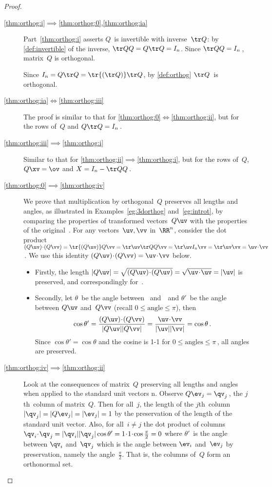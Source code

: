 \begin{proof}
\begin{description}
\item[\ref{thm:orthog:i}$\implies$\ref{thm:orthog:0},\ref{thm:orthog:ia}]
Part~\ref{thm:orthog:i} asserts \(Q\)~is invertible with inverse~\(\tr Q\): by \autoref{def:invertible} of the inverse, \(\tr QQ=Q\tr Q=I_n\).  
Since \(\tr QQ=I_n\)\,, matrix~\(Q\) is orthogonal.
 
Since \(I_n=Q\tr Q=\tr{(\tr Q)}\tr Q\), by \autoref{def:orthog} \(\tr Q\)~is orthogonal.

\item[\ref{thm:orthog:ia}$\iff$\ref{thm:orthog:iii}] 
The proof is similar to that for \ref{thm:orthog:0}$\iff$\ref{thm:orthog:ii}, but for the rows of~\(Q\) and \(Q\tr Q=I_n\)\,.

\item[\ref{thm:orthog:iii}$\implies$\ref{thm:orthog:i}] 
Similar to that for \ref{thm:orthog:ii}$\implies$\ref{thm:orthog:i}, but for the rows of~\(Q\), \(Q\xv=\ov\) and \(X=I_n-\tr QQ\)\,.

\item[\ref{thm:orthog:0}$\implies$\ref{thm:orthog:iv}] 
We prove that multiplication by orthogonal~\(Q\) preserves all lengths and angles, as illustrated in Examples~\ref{eg:3dorthog} and~\ref{eg:introt}, by comparing the properties of transformed vectors~\(Q\uv\) with the properties of the original~\uv.
For any vectors~\(\uv,\vv\) in~\(\RR^n\), consider the dot product
\((Q\uv)\cdot(Q\vv)=\tr{(Q\uv)}Q\vv
=\tr\uv\tr QQ\vv
=\tr\uv I_n\vv
=\tr\uv\vv=\uv\cdot\vv\)\,.  
We use this identity \((Q\uv)\cdot(Q\vv)=\uv\cdot\vv\) below.
\begin{itemize}
\item Firstly, the length \(|Q\uv|=\sqrt{(Q\uv)\cdot(Q\uv)}=\sqrt{\uv\cdot\uv}=|\uv|\) is preserved, and correspondingly for~\vv.
\item Secondly, let \(\theta\)~be the angle between \uv\ and~\vv\ and \(\theta'\)~be the angle between \(Q\uv\) and~\(Q\vv\) (recall \(0\leq\text{angle}\leq\pi\)), then
\begin{equation*}
\cos\theta'=\frac{(Q\uv)\cdot(Q\vv)}{|Q\uv||Q\vv|}
=\frac{\uv\cdot \vv}{|\uv||\vv|}
=\cos\theta\,.
\end{equation*}
Since \(\cos\theta'=\cos\theta\) and the cosine is 1-1 for \(0\leq\text{angles}\leq\pi\)\,, all angles are preserved.
\end{itemize}

\item[\ref{thm:orthog:iv}$\implies$\ref{thm:orthog:ii}]
Look at the consequences of matrix~\(Q\) preserving all lengths and angles when applied to the standard unit vectors \hlist\ev n.
Observe \(Q\ev_j=\qv_j\)\,, the \(j\)th~column of matrix~\(Q\).
Then for all~\(j\), the length of the \(j\)th~column \(|\qv_j|=|Q\ev_j|=|\ev_j|=1\) by the preservation of the length of the standard unit vector.
Also, for all~\(i\neq j\) the dot product of columns \(\qv_i\cdot\qv_j=|\qv_i||\qv_j|\cos\theta'=1\cdot1\cdot\cos\frac\pi2=0\) where \(\theta'\)~is the angle between \(\qv_i\) and~\(\qv_j\) which is the angle between \(\ev_i\) and~\(\ev_j\) by preservation, namely the angle~\(\frac\pi2\).
That is, the columns of~\(Q\) form an orthonormal set. 


\end{description}
\end{proof}
